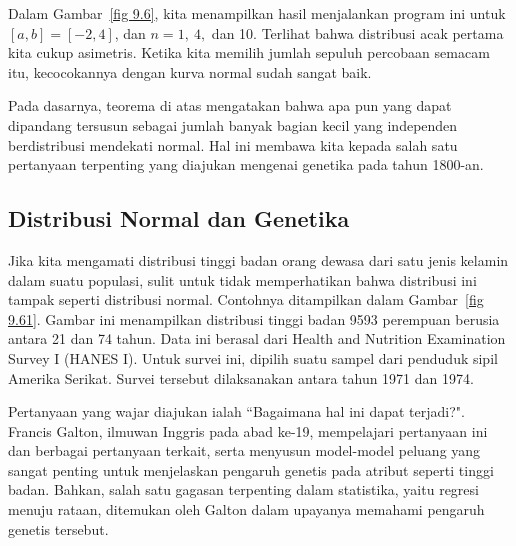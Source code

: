
Dalam Gambar~\ref{fig 9.6}, kita menampilkan hasil menjalankan program ini untuk
$[a, b] = [-2, 4]$, dan $n = 1,\ 4,$ dan 10.  Terlihat bahwa distribusi acak pertama kita cukup
asimetris.  Ketika kita memilih jumlah sepuluh percobaan semacam itu, kecocokannya dengan kurva
normal sudah sangat baik.
\par
Pada dasarnya, teorema di atas mengatakan bahwa apa pun yang dapat dipandang tersusun sebagai
jumlah banyak bagian kecil yang independen berdistribusi mendekati normal.  Hal ini membawa kita
kepada salah satu pertanyaan terpenting yang diajukan mengenai genetika pada tahun 1800-an.


\subsection*{Distribusi Normal dan Genetika}
Jika kita mengamati distribusi tinggi badan orang dewasa dari satu
jenis kelamin dalam suatu populasi, sulit untuk tidak memperhatikan bahwa distribusi ini tampak
seperti distribusi normal.  Contohnya ditampilkan dalam Gambar~\ref{fig 9.61}.  Gambar ini
menampilkan distribusi tinggi badan 9593 perempuan berusia antara 21 dan 74 tahun.  Data ini
berasal dari Health and Nutrition Examination Survey I (HANES I).
Untuk survei ini, dipilih suatu sampel dari penduduk sipil Amerika Serikat.  Survei tersebut
dilaksanakan antara tahun 1971 dan 1974.
\par
Pertanyaan yang wajar diajukan ialah ``Bagaimana hal ini dapat terjadi?".  Francis
Galton, ilmuwan Inggris pada abad ke-19, mempelajari pertanyaan ini dan berbagai
pertanyaan terkait, serta menyusun model-model peluang yang sangat penting untuk menjelaskan
pengaruh genetis pada atribut seperti tinggi badan.  Bahkan, salah satu gagasan terpenting dalam
statistika, yaitu regresi menuju rataan, ditemukan oleh Galton dalam
upayanya memahami pengaruh genetis tersebut.
 
